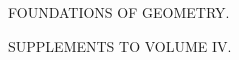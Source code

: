 \thispagestyle{empty}
\vspace*{2cm}
\begin{center}
{\Large FOUNDATIONS OF GEOMETRY.\par}
\vspace{1cm}
SUPPLEMENTS TO VOLUME IV.
\end{center}
\clearpage

